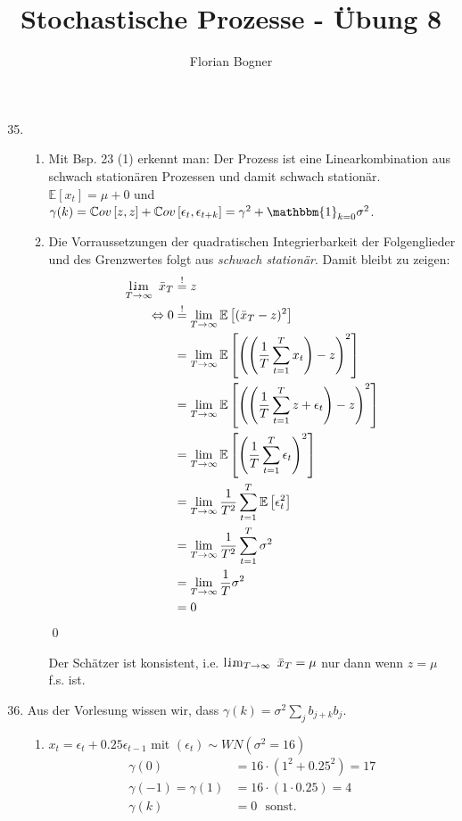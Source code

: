 \documentclass[a4paper,11pt,notitlepage,fullpage]{article}
\newcommand{\E}[1]{\mathbb E\left[#1\right]}
\newcommand{\Cov}[1]{\mathbb Cov\left[#1\right]}
\newcommand{\indd}[1]{\mathbbm{1}_{#1}}
\DeclareMathOperator*{\limm}{l.\hspace{-0.18em}i.\hspace{-0.19em}m}
\begin{document}
\author{Florian Bogner}
\title{Stochastische Prozesse - Übung 8}
\maketitle

\begin{enumerate}
\setcounter{enumi}{34}

\item 
\begin{enumerate}
\item Mit Bsp. 23 (1) erkennt man: Der Prozess ist eine Linearkombination aus schwach stationären Prozessen und damit schwach stationär. $\E{x_t} = \mu + 0$ und $\gamma(k) = \Cov{z, z} + \Cov{\epsilon_t, \epsilon_{t+k}} = \gamma^2 + \indd{k=0}\sigma^2$.

\item Die Vorraussetzungen der quadratischen Integrierbarkeit der Folgenglieder und des Grenzwertes folgt aus \emph{schwach stationär}. Damit bleibt zu zeigen:
\begin{align*}
\limm_{T\to\infty}~\bar x_T &\stackrel{!}{=} z \\
\Leftrightarrow 0 &\stackrel{!}{=} \lim_{T\to\infty} \E{(\bar x_T - z)^2} \\
&= \lim_{T\to\infty} \E{\left(\left(\frac{1}{T}\sum_{t=1}^T x_t\right) - z\right)^2} \\
&= \lim_{T\to\infty} \E{\left(\left(\frac{1}{T}\sum_{t=1}^T z + \epsilon_t\right) - z\right)^2} \\
&= \lim_{T\to\infty} \E{\left(\frac{1}{T}\sum_{t=1}^T \epsilon_t\right)^2} \\
&= \lim_{T\to\infty} \frac{1}{T^2} \sum_{t=1}^T \E{\epsilon_t^2} \\
&= \lim_{T\to\infty} \frac{1}{T^2} \sum_{t=1}^T \sigma^2 \\
&= \lim_{T\to\infty} \frac{1}{T} \sigma^2 \\
&= 0
\end{align*}
\qed

Der Schätzer ist konsistent, i.e. $\limm_{T\to\infty}~\bar x_T = \mu$ nur dann wenn $z = \mu$ f.s. ist.
\end{enumerate}

\item Aus der Vorlesung wissen wir, dass $\gamma(k) = \sigma^2 \sum_j b_{j+k}b_j$.
\begin{enumerate}
\item $x_t = \epsilon_t + 0.25 \epsilon_{t-1}$ mit $(\epsilon_t) \sim WN(\sigma^2 = 16)$
\begin{align*}
\gamma(0) &= 16 \cdot (1^2 + 0.25^2) = 17 \\
\gamma(-1) = \gamma(1) &= 16 \cdot (1 \cdot 0.25) = 4 \\
\gamma(k) &= 0~~~\text{sonst.}
\end{align*}


\end{enumerate}
\end{enumerate}
\end{document}
